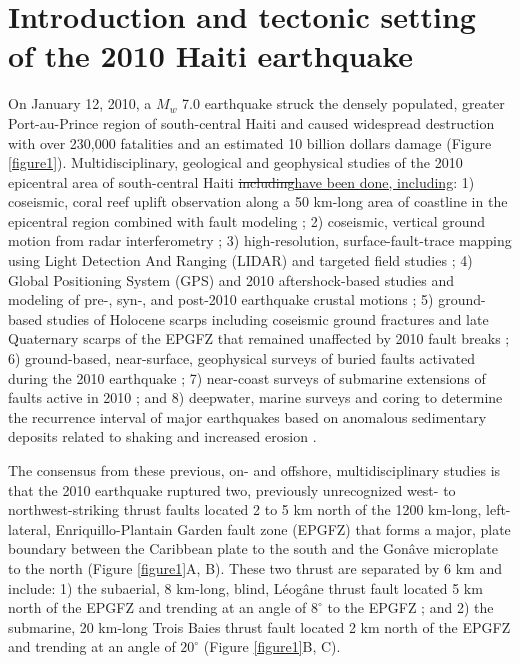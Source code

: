 \documentclass[linenumbers,draft]{agujournal}
\providecommand{\DIFdel}[1]{{\protect\color{red}\sout{#1}}}                      %
\providecommand{\DIFaddbegin}{} %
\providecommand{\DIFaddend}{} %
\providecommand{\DIFdelbegin}{} %
\providecommand{\DIFdelend}{} %
\begin{document}
\section{Introduction and tectonic setting of the 2010 Haiti earthquake}
\label{sec:intro}
On January 12, 2010, a $M_w$ 7.0 earthquake struck the densely populated, greater Port-au-Prince region of south-central Haiti and caused widespread destruction with over 230,000 fatalities and an estimated 10 billion dollars damage \citep{prentice2010seismic,bilham2010lessons,paultre2013damage,kocel2016near} (Figure \ref{figure1}). Multidisciplinary, geological and geophysical studies of the 2010 epicentral area of south-central Haiti \DIFdelbegin \DIFdel{including}\DIFdelend \DIFaddbegin \ul{have been done, including}\DIFaddend : 1) coseismic, coral reef uplift observation along a 50 km-long area of coastline in the epicentral region combined with fault modeling \citep{hayes2010complex}; 2) coseismic, vertical ground motion from radar interferometry \citep{hashimoto2011fan}; 3) high-resolution, surface-fault-trace mapping using Light Detection And Ranging (LIDAR) and targeted field studies \citep{cowgill2012interactive}; 4) Global Positioning System (GPS) and 2010 aftershock-based studies and modeling of pre-, syn-, and post-2010 earthquake crustal motions \citep{calais2010transpressional,nettles2010earthquake,symithe2013coseismic,douilly2013crustal,douilly2015three}; 5) ground-based studies of Holocene scarps including coseismic ground fractures and late Quaternary scarps of the EPGFZ that remained unaffected by 2010 fault breaks \citep{prentice2010seismic,koehler2011field,rathje2014geotechnical,saint2015seismotectonics}; 6) ground-based, near-surface, geophysical surveys of buried faults activated during the 2010 earthquake \citep{kocel2016near}; 7) near-coast surveys of submarine extensions of faults active in 2010 \citep{hornbach2010high,mercier20112010}; and 8) deepwater, marine surveys and coring to determine the recurrence interval of major earthquakes based on anomalous sedimentary deposits related to shaking and increased erosion \citep{mchugh2011offshore}.

The consensus from these previous, on- and offshore, multidisciplinary studies is that the 2010 earthquake ruptured two, previously unrecognized west- to northwest-striking thrust faults located 2 to 5 km north of the 1200 km-long, left-lateral, Enriquillo-Plantain Garden fault zone (EPGFZ) that forms a major, plate boundary between the Caribbean plate to the south and the Gon\^ave microplate to the north \citep{mann1995actively,calais2010transpressional,benford2012gps,corbeau2016transpressive} (Figure \ref{figure1}A, B). These two thrust are separated by 6 km and include: 1) the subaerial, 8 km-long, blind, L\'eog\^ane thrust fault located 5 km north of the EPGFZ and trending at an angle of $8^{\circ}$ to the EPGFZ \citep{calais2010transpressional,douilly2013crustal,douilly2015three}; and 2) the submarine, 20 km-long Trois Baies thrust fault located 2 km north of the EPGFZ and trending at an angle of $20^{\circ}$ \citep{mercier20112010,symithe2013coseismic} (Figure \ref{figure1}B, C).
\end{document}
